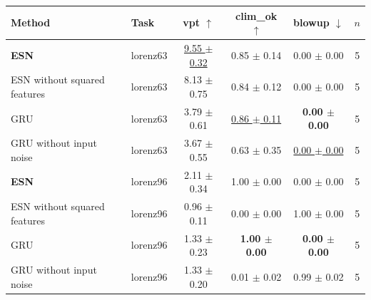 \begin{tabular}{llcccc}
\toprule
Method & Task & vpt $\uparrow$ & clim\_ok $\uparrow$ & blowup $\downarrow$ & $n$ \\
\midrule
\textbf{ESN} & lorenz63 & \underline{9.55 $\pm$ 0.32} & 0.85 $\pm$ 0.14 & 0.00 $\pm$ 0.00 & 5 \\
ESN without squared features & lorenz63 & 8.13 $\pm$ 0.75 & 0.84 $\pm$ 0.12 & 0.00 $\pm$ 0.00 & 5 \\
GRU & lorenz63 & 3.79 $\pm$ 0.61 & \underline{0.86 $\pm$ 0.11} & \textbf{0.00 $\pm$ 0.00} & 5 \\
GRU without input noise & lorenz63 & 3.67 $\pm$ 0.55 & 0.63 $\pm$ 0.35 & \underline{0.00 $\pm$ 0.00} & 5 \\
\midrule
\textbf{ESN} & lorenz96 & 2.11 $\pm$ 0.34 & 1.00 $\pm$ 0.00 & 0.00 $\pm$ 0.00 & 5 \\
ESN without squared features & lorenz96 & 0.96 $\pm$ 0.11 & 0.00 $\pm$ 0.00 & 1.00 $\pm$ 0.00 & 5 \\
GRU & lorenz96 & 1.33 $\pm$ 0.23 & \textbf{1.00 $\pm$ 0.00} & \textbf{0.00 $\pm$ 0.00} & 5 \\
GRU without input noise & lorenz96 & 1.33 $\pm$ 0.20 & 0.01 $\pm$ 0.02 & 0.99 $\pm$ 0.02 & 5 \\
\bottomrule
\end{tabular}
